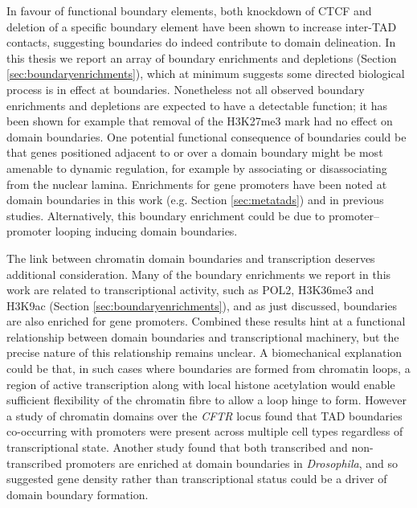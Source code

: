 \documentclass[a4paper,11pt,oneside]{book}
\begin{document}
In favour of functional boundary elements, both knockdown of CTCF\cite{Zuin2013} and deletion of a specific boundary element\cite{Nora2012} have been shown to increase inter-TAD contacts, suggesting boundaries do indeed contribute to domain delineation. In this thesis we report an array of boundary enrichments and depletions (Section \ref{sec:boundaryenrichments}), which at minimum suggests some directed biological process is in effect at boundaries. Nonetheless not all observed boundary enrichments and depletions are expected to have a detectable function; it has been shown for example that removal of the H3K27me3 mark had no effect on domain boundaries.\cite{Nora2012} One potential functional consequence of boundaries could be that genes positioned adjacent to or over a domain boundary might be most amenable to dynamic regulation, for example by associating or disassociating from the nuclear lamina. Enrichments for gene promoters have been noted at domain boundaries in this work (e.g. Section \ref{sec:metatads}) and in previous studies.\cite{Dixon2012} Alternatively, this boundary enrichment could be due to promoter--promoter looping inducing domain boundaries.\cite{Li2012a, Sanyal2012, Sexton2015} 

The link between chromatin domain boundaries and transcription deserves additional consideration. Many of the boundary enrichments we report in this work are related to transcriptional activity, such as POL2, H3K36me3 and H3K9ac (Section \ref{sec:boundaryenrichments}), and as just discussed, boundaries are also enriched for gene promoters. Combined these results hint at a functional relationship between domain boundaries and transcriptional machinery, but the precise nature of this relationship remains unclear. A biomechanical explanation could be that, in such cases where boundaries are formed from chromatin loops, a region of active transcription along with local histone acetylation would enable sufficient flexibility of the chromatin fibre to allow a loop hinge to form. However a study of chromatin domains over the \emph{CFTR} locus found that TAD boundaries co-occurring with promoters were present across multiple cell types regardless of transcriptional state.\cite{Smith2016a} Another study found that both transcribed and non-transcribed promoters are enriched at domain boundaries in \emph{Drosophila},\cite{Hou2012} and so suggested gene density rather than transcriptional status could be a driver of domain boundary formation.
\end{document}
